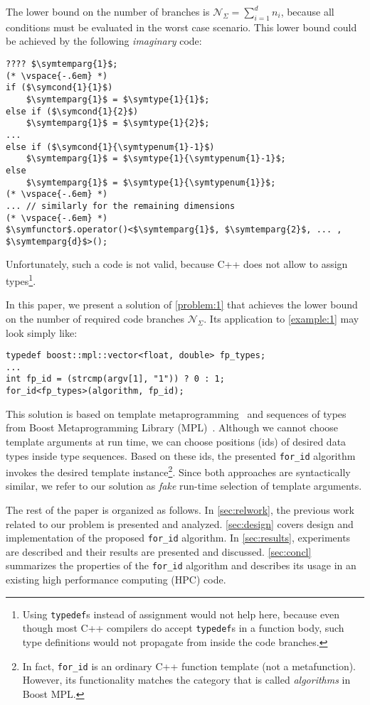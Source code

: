 \documentclass[10pt,a4paper]{article}
\theoremstyle{definition}\newtheorem{problem}{Problem}
\providecommand{\symtype}[2]{\ensuremath{t_{#1}^{#2}}}
\providecommand{\symtypenum}[1]{\ensuremath{n_{#1}}}
\providecommand{\symcond}[2]{\ensuremath{c_{#1}^{#2}}}
\providecommand{\symtemparg}[1]{\ensuremath{t_{#1}}}
\providecommand{\symfunctor}{\ensuremath{\mathtt{f}}}
\providecommand{\symcbsum}{\ensuremath{\mathcal{N}_{\Sigma}}\xspace}
\providecommand{\forid}{\texttt{for\_id}\xspace}
\begin{document}
The lower bound on the number of branches is $\symcbsum=\sum_{i=1}^d\symtypenum{i}$, because all conditions must be evaluated in the worst case scenario. This lower bound could be achieved by the following \emph{imaginary} code:
\begin{lstlisting}
???? $\symtemparg{1}$;
(* \vspace{-.6em} *)
if ($\symcond{1}{1}$)
    $\symtemparg{1}$ = $\symtype{1}{1}$;
else if ($\symcond{1}{2}$)
    $\symtemparg{1}$ = $\symtype{1}{2}$;
...
else if ($\symcond{1}{\symtypenum{1}-1}$)
    $\symtemparg{1}$ = $\symtype{1}{\symtypenum{1}-1}$;
else
    $\symtemparg{1}$ = $\symtype{1}{\symtypenum{1}}$;
(* \vspace{-.6em} *)
... // similarly for the remaining dimensions
(* \vspace{-.6em} *)
$\symfunctor$.operator()<$\symtemparg{1}$, $\symtemparg{2}$, ... , $\symtemparg{d}$>();
\end{lstlisting}
Unfortunately, such a code is not valid, because C++ does not allow to assign types\footnote{Using \texttt{typedef}s instead of assignment would not help here, because even though most C++ compilers do accept \texttt{typedef}s in a function body, such type definitions would not propagate from inside the code branches.}.

In this paper, we present a solution of \autoref{problem:1} that achieves the lower bound on the number of required code branches \symcbsum. Its application to \autoref{example:1} may look simply like:
\begin{lstlisting}
typedef boost::mpl::vector<float, double> fp_types;
...
int fp_id = (strcmp(argv[1], "1")) ? 0 : 1;
for_id<fp_types>(algorithm, fp_id);
\end{lstlisting}
This solution is based on template metaprogramming~\cite{RefWorks:51,RefWorks:84,RefWorks:82,RefWorks:83} and sequences of types from Boost Metaprogramming Library (MPL)~\cite{RefWorks:53}. Although we cannot choose template arguments at run time, we can choose positions (ids) of desired data types inside type sequences. Based on these ids, the presented \forid algorithm invokes the desired template instance\footnote{In fact, \texttt{for\_id} is an ordinary C++ function template (not a metafunction). However, its functionality matches the category that is called \emph{algorithms} in Boost MPL.}. Since both approaches are syntactically similar, we refer to our solution as \emph{fake} run-time selection of template arguments.

The rest of the paper is organized as follows. In \autoref{sec:relwork}, the previous work related to our problem is presented and analyzed. \autoref{sec:design} covers design and implementation of the proposed \forid algorithm. In \autoref{sec:results}, experiments are described and their results are presented and discussed. \autoref{sec:concl} summarizes the properties of the \forid algorithm and describes its usage in an existing high performance computing (HPC) code.
\end{document}
